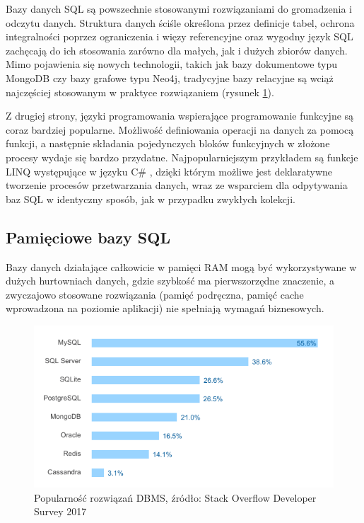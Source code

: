 \documentclass[12pt,twoside,openright]{extarticle}
\begin{document}
    Bazy danych SQL są powszechnie stosowanymi rozwiązaniami do gromadzenia i odczytu danych. Struktura danych ściśle określona przez definicje tabel, ochrona integralności poprzez ograniczenia i więzy referencyjne oraz wygodny język SQL zachęcają do ich stosowania zarówno dla małych, jak i dużych zbiorów danych. Mimo pojawienia się nowych technologii, takich jak bazy dokumentowe typu MongoDB czy bazy grafowe typu Neo4j, tradycyjne bazy relacyjne są wciąż najczęściej stosowanym w praktyce rozwiązaniem (rysunek \ref{fig:dbstats}).

    Z drugiej strony, języki programowania wspierające programowanie funkcyjne są coraz bardziej popularne. Możliwość definiowania operacji na danych za pomocą funkcji, a następnie składania pojedynczych bloków funkcyjnych w złożone procesy wydaje się bardzo przydatne. Najpopularniejszym przykładem są funkcje LINQ występujące w języku C\# \cite{linq}, dzięki którym możliwe jest deklaratywne tworzenie procesów przetwarzania danych, wraz ze wsparciem dla odpytywania baz SQL w identyczny sposób, jak w przypadku zwykłych kolekcji.


\subsection{Pamięciowe bazy SQL}

    Bazy danych działające całkowicie w pamięci RAM mogą być wykorzystywane w dużych hurtowniach danych, gdzie szybkość ma pierwszorzędne znaczenie, a zwyczajowo stosowane rozwiązania (pamięć podręczna, pamięć cache wprowadzona na poziomie aplikacji) nie spełniają wymagań biznesowych.

\begin{figure}[h]
\centering
\includegraphics{dbstats.png}
\caption{Popularność rozwiązań DBMS, źródło: Stack Overflow Developer Survey 2017}
\label{fig:dbstats}
\end{figure}
\end{document}
